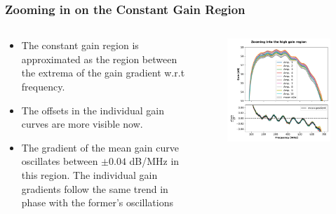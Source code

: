 \documentclass[9pt, aspectratio=169]{beamer}
\begin{document}
\begin{frame}
	\frametitle{Zooming in on the Constant Gain Region}
	
	\begin{columns}
		\begin{column}{.45\textwidth}
			\begin{itemize}
				\item The constant gain region is approximated as the region between the extrema of the gain gradient w.r.t frequency.
				\item The offsets in the individual gain curves are more visible now.
				\item The gradient of the mean gain curve oscillates between $\pm 0.04$ dB/MHz in this region. The individual gain gradients follow the same trend in phase with the former's oscillations
			\end{itemize}
		\end{column}
		
		\begin{column}{.55\textwidth}
			\begin{figure}[H]
				\centering
				\includegraphics[width=1.0\linewidth]{../zoomed}
				\label{fig:zoomed}
			\end{figure}
		\end{column}
	\end{columns}
	
	
\end{frame}
\end{document}
